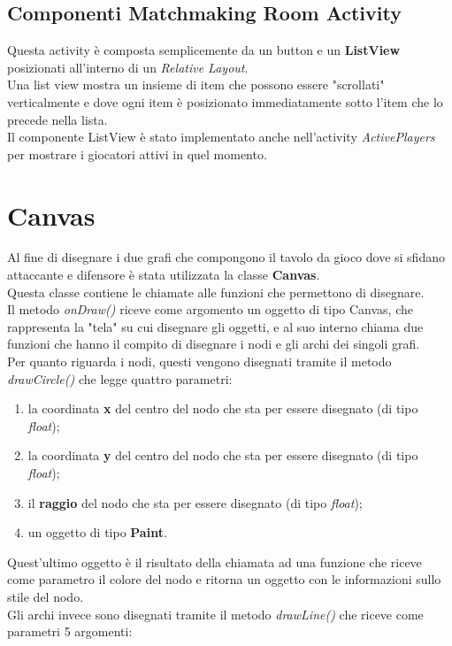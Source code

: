 \documentclass[a4paper,11pt,twoside,openright]{report}
\begin{document}
\subsection{Componenti Matchmaking Room Activity}
Questa activity è composta semplicemente da un button e un \textbf{ListView} posizionati all'interno di un \textit{Relative Layout}.\\
Una list view mostra un insieme di item che possono essere "scrollati" verticalmente e dove ogni item è posizionato immediatamente sotto l'item che lo precede nella lista.\\
Il componente ListView è stato implementato anche nell'activity \textit{ActivePlayers} per mostrare i giocatori attivi in quel momento.

\section{Canvas}
Al fine di disegnare i due grafi che compongono il tavolo da gioco dove si sfidano attaccante e difensore è stata utilizzata la classe \textbf{Canvas}.\\
Questa classe contiene le chiamate alle funzioni che permettono di disegnare.\\
Il metodo \textit{onDraw()} riceve come argomento un oggetto di tipo Canvas, che rappresenta la "tela" su cui disegnare gli oggetti, e al suo interno chiama due funzioni che hanno il compito di disegnare i nodi e gli archi dei singoli grafi.\\
Per quanto riguarda i nodi, questi vengono disegnati tramite il metodo \textit{drawCircle()} che legge quattro parametri:

\begin{enumerate}
\item la coordinata \textbf{x} del centro del nodo che sta per essere disegnato (di tipo \textit{float});

\item la coordinata \textbf{y} del centro del nodo che sta per essere disegnato (di tipo \textit{float});

\item il \textbf{raggio} del nodo che sta per essere disegnato (di tipo \textit{float});

\item un oggetto di tipo \textbf{Paint}.
\end{enumerate}

Quest'ultimo oggetto è il risultato della chiamata ad una funzione che riceve come parametro il colore del nodo e ritorna un oggetto con le informazioni sullo stile del nodo.\\ 
Gli archi invece sono disegnati tramite il metodo \textit{drawLine()} che riceve come parametri 5 argomenti:
\end{document}
